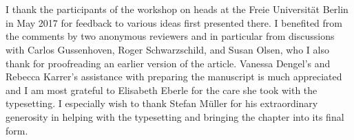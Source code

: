 \documentclass[output=paper
 ,nobabel
 ,draftmode
 ,colorlinks, citecolor=brown
]{langscibook}
\begin{document}
\section*{\acknowledgmentsUS}

I thank the participants of the workshop on heads at the Freie Universität Berlin in May 2017 for
feedback to various ideas first presented there. I benefited from the comments by two anonymous
reviewers and in particular from discussions with Carlos Gussenhoven, Roger Schwarzschild, and Susan
Olsen, who I also thank for proofreading an earlier version of the article. Vanessa Dengel's and
Rebecca Karrer's assistance with preparing the manuscript is much appreciated and I am most grateful
to Elisabeth Eberle for the care she took with the typesetting. I especially wish to
thank Stefan Müller for his extraordinary generosity in helping with the typesetting and
bringing the chapter into its final form.

{\sloppy
\printbibliography[heading=subbibliography,notkeyword=this]
}
\end{document}
